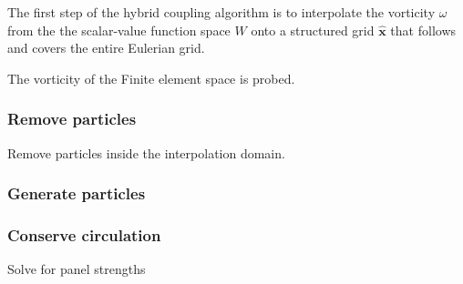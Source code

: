 The first step of the hybrid coupling algorithm is to interpolate the vorticity $\omega$ from the the scalar-value function space $W$ onto a structured grid $\hat{\mathbf{x}}$ that follows and covers the entire Eulerian grid.



The vorticity of the Finite element space is probed.

\subsubsection*{Remove particles}

Remove particles inside the interpolation domain.

\subsubsection*{Generate particles}

\subsubsection*{Conserve circulation}

Solve for panel strengths
%
%
%

